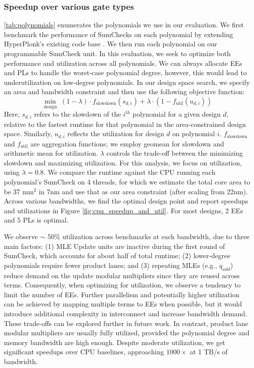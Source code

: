 \subsubsection{Speedup over various gate types}
\label{sec:speedup_and_util}
\autoref{tab:polynomials} enumerates the polynomials we use in our evaluation. We first benchmark the performance of SumChecks on each polynomial by extending HyperPlonk's existing code base \cite{hyperplonk}. We then run each polynomial on our programmable SumCheck unit. In this evaluation, we seek to optimize both performance and utilization across all polynomials. We can always allocate EEs and PLs to handle the worst-case polynomial degree, however, this would lead to underutilization on low-degree polynomials. In our design space search, we specify an area and bandwidth constraint and then use the following objective function:
\begin{equation*}
    \min_{\text{design}} \; (1 - \lambda) \cdot f_{\text{slowdown}}(s_{d,i}) + \lambda \cdot (1 - f_{\text{util}}(u_{d,i}))
\end{equation*}
Here, $s_{d,i}$ refers to the slowdown of the $i^{th}$ polynomial for a given design $d$, relative to the fastest runtime for that polynomial in the area-constrained design space. Similarly, $u_{d,i}$ reflects the utilization for design $d$ on polynomial $i$. $f_\text{slowdown}$ and $f_\text{util}$ are aggregation functions; we employ geomean for slowdown and arithmetic mean for utilization. $\lambda$ controls the trade-off between the minimizing slowdown and maximizing utilization. For this analysis, we focus on utilization, using $\lambda = 0.8$. We compare the runtime against the CPU running each polynomial's SumCheck on 4 threads, for which we estimate the total core area to be 37 mm$^2$ in 7nm \cite{cpu_amd1, cpu_amd2, cpu_amd3} and use that as our area constraint (after scaling from 22nm). Across various bandwidths, we find the optimal design point and report speedups and utilizations in Figure \ref{fig:cpu_speedup_and_util}. For most designs, 2 EEs and 5 PLs is optimal.

We observe $\sim$ 50\% utilization across benchmarks at each bandwidth, due to three main factors: (1) MLE Update units are inactive during the first round of SumCheck, which accounts for about half of total runtime; (2) lower-degree polynomials require fewer product lanes; and (3) repeating MLEs (e.g., $q_{add}$) reduce demand on the update modular multipliers since they are reused across terms.
Consequently, when optimizing for utilization, we observe a tendency to limit the number of EEs. Further parallelism and potentially higher utilization can be achieved by mapping multiple terms to EEs when possible, but it would introduce additional complexity in interconnect and increase bandwidth demand. These trade-offs can be explored further in future work.
In contrast, product lane modular multipliers are usually fully utilized, provided the polynomial degree and memory bandwidth are high enough.
Despite moderate utilization, we get significant speedups over CPU baselines, approaching $1000\times$ at 1 TB/s of bandwidth. 

